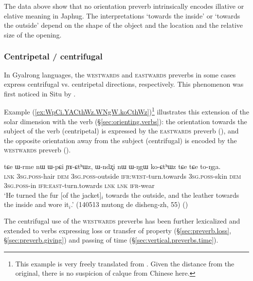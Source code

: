 The data above show that no orientation preverb intrinsically encodes illative or elative meaning in Japhug. The interpretations `towards the inside' or `towards the outside' depend on the shape of the object and the location and the relative size of the opening.
 
\subsubsection{Centripetal / centrifugal} \label{sec:centripetal.centrifugal}
In Gyalrong languages, the \textsc{westwards} and \textsc{eastwards} preverbs in some cases express centrifugal vs. centripetal directions, respectively. This phenomenon was first noticed in Situ by \citet[228--229]{linxr93jiarong}.
 
Example (\ref{ex:WpCi.YACthWz.WNgW.koCthWz})\footnote{This example is very freely translated from . Given the distance from the original, there is no suspicion of calque from Chinese here. } illustrates this extension of the solar dimension with the verb  (§\ref{sec:orienting.verbs}): the orientation towards the subject of the verb (centripetal) is expressed by the \textsc{eastwards} preverb (), and the opposite orientation away from the subject (centrifugal) is encoded by the \textsc{westwards} preverb ().

\begin{exe}
\ex \label{ex:WpCi.YACthWz.WNgW.koCthWz}
\gll  tɕe ɯ-rme nɯ ɯ-pɕi ɲɤ-ɕtʰɯz, ɯ-ndʐi nɯ ɯ-ŋgɯ ko-ɕtʰɯz tɕe tɕe to-ŋga.  \\
\textsc{lnk} \textsc{3sg}.\textsc{poss}-hair \textsc{dem} \textsc{3sg}.\textsc{poss}-outside \textsc{ifr}:\textsc{west}-turn.towards \textsc{3sg}.\textsc{poss}-skin \textsc{dem} \textsc{3sg}.\textsc{poss}-in \textsc{ifr}:\textsc{east}-turn.towards \textsc{lnk} \textsc{lnk} \textsc{ifr}-wear \\
\glt `He turned the fur [of the jacket]$_i$ towards the outside, and the leather towards the inside and wore it$_i$.' (140513 mutong de disheng-zh, 55)
()
\end{exe}  

The centrifugal use of the \textsc{westwards} preverbs has been further lexicalized and extended to verbs expressing loss or transfer of property (§\ref{sec:preverb.loss}, §\ref{sec:preverb.giving}) and passing of time (§\ref{sec:vertical.preverbs.time}).

